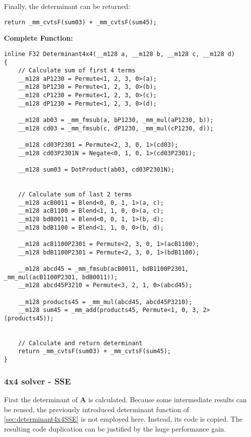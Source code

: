 Finally, the determinant can be returned:

\begin{verbatim}
return _mm_cvtsF(sum03) + _mm_cvtsF(sum45);
\end{verbatim}




\vspace{1cm}
\textbf{Complete Function:}

\begin{verbatim}
inline F32 Determinant4x4(__m128 a, __m128 b, __m128 c, __m128 d)
{
    // Calculate sum of first 4 terms
    __m128 aP1230 = Permute<1, 2, 3, 0>(a);
    __m128 bP1230 = Permute<1, 2, 3, 0>(b);
    __m128 cP1230 = Permute<1, 2, 3, 0>(c);
    __m128 dP1230 = Permute<1, 2, 3, 0>(d);

    __m128 ab03 = _mm_fmsub(a, bP1230, _mm_mul(aP1230, b));
    __m128 cd03 = _mm_fmsub(c, dP1230, _mm_mul(cP1230, d));

    __m128 cd03P2301 = Permute<2, 3, 0, 1>(cd03);
    __m128 cd03P2301N = Negate<0, 1, 0, 1>(cd03P2301);

    __m128 sum03 = DotProduct(ab03, cd03P2301N);


    // Calculate sum of last 2 terms
    __m128 acB0011 = Blend<0, 0, 1, 1>(a, c);
    __m128 acB1100 = Blend<1, 1, 0, 0>(a, c);
    __m128 bdB0011 = Blend<0, 0, 1, 1>(b, d);
    __m128 bdB1100 = Blend<1, 1, 0, 0>(b, d);

    __m128 acB1100P2301 = Permute<2, 3, 0, 1>(acB1100);
    __m128 bdB1100P2301 = Permute<2, 3, 0, 1>(bdB1100);

    __m128 abcd45 = _mm_fmsub(acB0011, bdB1100P2301, _mm_mul(acB1100P2301, bdB0011));
    __m128 abcd45P3210 = Permute<3, 2, 1, 0>(abcd45);

    __m128 products45 = _mm_mul(abcd45, abcd45P3210);
    __m128 sum45 = _mm_add(products45, Permute<1, 0, 3, 2>(products45));


    // Calculate and return determinant
    return _mm_cvtsF(sum03) + _mm_cvtsF(sum45);
}
\end{verbatim}




\newpage
\subsubsection{4x4 solver - SSE}

First the determinant of $\mathbf{A}$ is calculated.
Because some intermediate results can be reused, the previously introduced determinant function of \cref{sec:determinant4x4SSE} is not employed here. 
Instead, its code is copied. 
The resulting code duplication can be justified by the huge performance gain.

